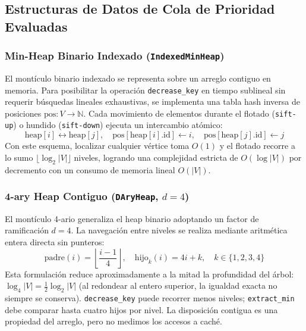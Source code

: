 \subsection{Estructuras de Datos de Cola de Prioridad Evaluadas}

\subsubsection{Min-Heap Binario Indexado (\texttt{IndexedMinHeap})}
El montículo binario indexado se representa sobre un arreglo contiguo en memoria. Para posibilitar la operación \texttt{decrease\_key} en tiempo sublineal sin requerir búsquedas lineales exhaustivas, se implementa una tabla hash inversa de posiciones $\text{pos}: V \to \mathbb{N}$. Cada movimiento de elementos durante el flotado (\texttt{sift-up}) o hundido (\texttt{sift-down}) ejecuta un intercambio atómico:
\begin{equation}
    \text{heap}[i] \leftrightarrow \text{heap}[j], \quad \text{pos}[\text{heap}[i].\text{id}] \leftarrow i, \quad \text{pos}[\text{heap}[j].\text{id}] \leftarrow j
    \label{eq:swap}
\end{equation}
Con este esquema, localizar cualquier vértice toma $O(1)$ y el flotado recorre a lo sumo $\lfloor \log_2 |V| \rfloor$ niveles, logrando una complejidad estricta de $O(\log |V|)$ por decremento con un consumo de memoria lineal $O(|V|)$.

\subsubsection{4-ary Heap Contiguo (\texttt{DAryHeap}, $d=4$)}
El montículo 4-ario generaliza el heap binario adoptando un factor de ramificación $d=4$. La navegación entre niveles se realiza mediante aritmética entera directa sin punteros:
\begin{equation}
    \text{padre}(i) = \left\lfloor \frac{i - 1}{4} \right\rfloor, \quad \text{hijo}_k(i) = 4i + k, \quad k \in \{1, 2, 3, 4\}
    \label{eq:aritmetica_4ary}
\end{equation}
Esta formulación reduce aproximadamente a la mitad la profundidad del árbol: $\log_4 |V| = \tfrac{1}{2}\log_2 |V|$ (al redondear al entero superior, la igualdad exacta no siempre se conserva). \texttt{decrease\_key} puede recorrer menos niveles; \texttt{extract\_min} debe comparar hasta cuatro hijos por nivel. La disposición contigua es una propiedad del arreglo, pero no medimos los accesos a caché.

